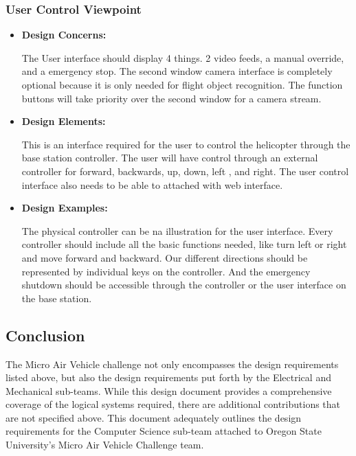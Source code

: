 \documentclass[onecolumn, draftclsnofoot,10pt, compsoc]{IEEEtran}
\begin{document}
\subsubsection{User Control Viewpoint}%
\begin{itemize}
\item{ \textbf{Design Concerns:}}

The User interface should display 4 things. 2 video feeds, a manual override, and a emergency stop. The second window camera interface is completely optional because it is only needed for flight object recognition. The function buttons will take priority over the second window for a camera stream. \\
\item{ \textbf{Design Elements:}}

This is an interface required for the user to control the helicopter through the base station controller. The user will have control through an external controller for forward, backwards, up, down, left , and right. The user control interface also needs to be able to attached with web interface. \\ 
\item{ \textbf{Design Examples:}} %

The physical controller can be na illustration for the user interface. Every controller should include all the basic functions needed, like turn left or right and move forward and backward. Our different directions should be represented by individual keys on the controller. And the emergency shutdown should be accessible through the controller or the user interface on the base station.
\end{itemize}


\subsection{Conclusion}

The Micro Air Vehicle challenge not only encompasses the design requirements listed above, but also the design requirements put forth by the Electrical and Mechanical sub-teams. While this design document provides a comprehensive coverage of the logical systems required, there are additional contributions that are not specified above. This document adequately outlines the design requirements for the Computer Science sub-team attached to Oregon State University's Micro Air Vehicle Challenge team. 
\end{document}

